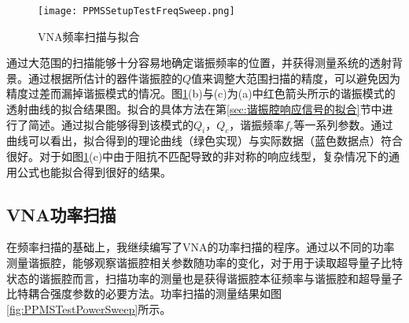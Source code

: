                         
            \begin{figure}[h]
                \centering
                \texttt{[image: PPMSSetupTestFreqSweep.png]}
                \caption{VNA频率扫描与拟合}
                \label{fig:PPMSSetupTestFreqSweep}
            \end{figure}

            通过大范围的扫描能够十分容易地确定谐振频率的位置，并获得测量系统的透射背景。通过根据所估计的器件谐振腔的$Q$值来调整大范围扫描的精度，可以避免因为精度过差而漏掉谐振模式的情况。图\ref{fig:PPMSSetupTestFreqSweep}(b)与(c)为(a)中红色箭头所示的谐振模式的透射曲线的拟合结果图。拟合的具体方法在第\ref{sec:谐振腔响应信号的拟合}节中进行了简述。通过拟合能够得到该模式的$Q_i$，$Q_c$，谐振频率$f_r$等一系列参数。通过曲线可以看出，拟合得到的理论曲线（绿色实现）与实际数据（蓝色数据点）符合很好。对于如图\ref{fig:PPMSSetupTestFreqSweep}(c)中由于阻抗不匹配导致的非对称的响应线型，复杂情况下的通用公式也能拟合得到很好的结果。



                  \subsection{VNA功率扫描} %
                  \label{sub:vna功率扫描}

                  在频率扫描的基础上，我继续编写了VNA的功率扫描的程序。通过以不同的功率测量谐振腔，能够观察谐振腔相关参数随功率的变化\cite{Day2003,Gao2008Thesis}，对于用于读取超导量子比特状态的谐振腔而言，扫描功率的测量也是获得谐振腔本征频率与谐振腔和超导量子比特耦合强度参数的必要方法\cite{Blais2004,Blais2007,schuster2007circuit}。功率扫描的测量结果如图\ref{fig:PPMSTestPowerSweep}所示。


